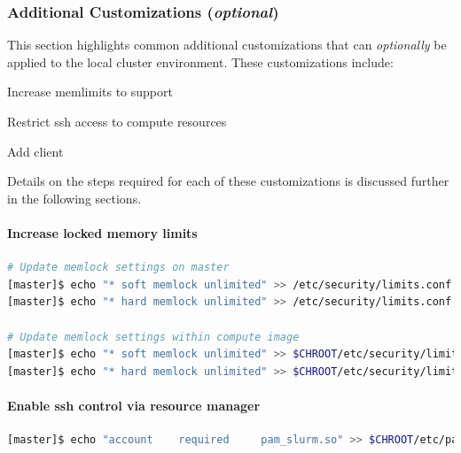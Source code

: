 \documentclass[letterpaper]{article}
\begin{document}
\newpage
\subsubsection{Additional Customizations ({\em optional})}

This section highlights common additional customizations that
can {\em optionally} be applied to the
local cluster environment. These customizations include:

\begin{itemize*}
\item Increase memlimits to support \InfiniBand{}
\item Restrict ssh access to compute resources
\item Add \Lustre{} client
\end{itemize*}

\noindent Details on the steps required for each of these customizations is
discussed further in the following sections.

\paragraph{Increase locked memory limits}

 

\begin{lstlisting}[language=bash,keywords={},upquote=true]
# Update memlock settings on master
[master]$ echo "* soft memlock unlimited" >> /etc/security/limits.conf
[master]$ echo "* hard memlock unlimited" >> /etc/security/limits.conf

# Update memlock settings within compute image
[master]$ echo "* soft memlock unlimited" >> $CHROOT/etc/security/limits.conf
[master]$ echo "* hard memlock unlimited" >> $CHROOT/etc/security/limits.conf
\end{lstlisting}


\paragraph{Enable ssh control via resource manager} 



\begin{lstlisting}[language=bash,keywords={},upquote=true]
[master]$ echo "account    required     pam_slurm.so" >> $CHROOT/etc/pam.d/sshd
\end{lstlisting}
\end{document}
